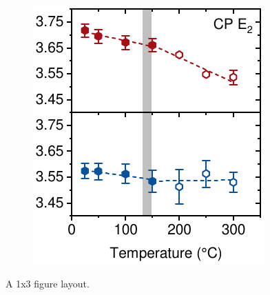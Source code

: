 \begin{figure}[htbp]
\begin{subfigure}{0.31\textwidth}
        \caption{}
        \label{fig:ellipsometry:CP1}
    \end{subfigure}
    \hfill
    \begin{subfigure}{0.31\textwidth}
        \includegraphics[width=\textwidth]{chapters/ellipsometry/image/CP3}
        \caption{}
        \label{fig:ellipsometry:deriv:CP2}
    \end{subfigure}
    \caption{A 1x3 figure layout.}
    \label{fig:ellipsometry:CP_all}
\end{figure}



